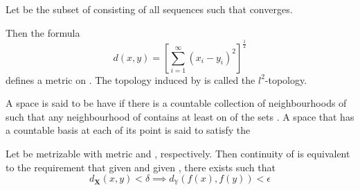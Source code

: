 \begin{definition}[$l^{2}$-topology]\label{def:L2Topology}
      Let  be the subset of  consisting of all sequences  such that  converges.

      Then the formula
      \begin{equation*}
            d(x,y) = \left[
                  \sum_{i=1}^{\infty}(x_{i}-y_{i})^{2}
            \right]^{\frac{1}{2}}
      \end{equation*}
      defines a metric on . The topology induced by  is called the $l^{2}$-topology.
\end{definition}

\begin{definition}\label{def:CountableBasisAtPointX}
      A space is said to be have  if there is a countable collection  of neighbourhoods of  such that any neighbourhood  of  contains at least on of the sets . A space  that has a countable basis at each of its point is said to satisfy the \label{def:FirstCountabilityAxiom}
\end{definition}

\begin{theorem}
      Let  be metrizable with metric  and , respectively. Then continuity of  is equivalent to the requirement that given  and given , there exists  such that
      \begin{equation*}
            d_{\mathbf{X}}(x,y) < \delta \implies d_{\mathbb{Y}}(f(x),f(y)) < \epsilon
      \end{equation*}
\end{theorem}

